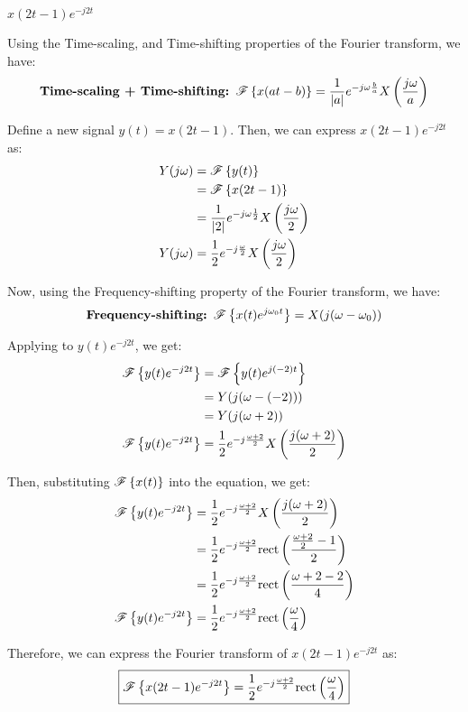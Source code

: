\documentclass[a4paper, 10pt]{article}
\begin{document}
\begin{tosubmit}
\begin{subproblems}[start=4]
    \item \( x(2t-1) e^{-j2t} \)
\end{subproblems}

\par\noindent\submitsolution
Using the Time-scaling, and Time-shifting properties of the Fourier transform, we have:
\[
    \textbf{Time-scaling + Time-shifting: } \mathscr{F} \left\{ x(at - b) \right\} = \frac{1}{|a|} e^{-j\omega \frac{b}{a}} X\left( \frac{j\omega}{a} \right)
\]

Define a new signal \( y(t) = x(2t - 1) \). Then, we can express \( x(2t - 1) e^{-j2t} \) as:
\begin{align*}
    Y(j\omega) &= \mathscr{F} \left\{ y(t) \right\} \\
    &= \mathscr{F} \left\{ x(2t - 1) \right\} \\
    &= \frac{1}{|2|} e^{-j\omega \frac{1}{2}} X\left( \frac{j\omega}{2} \right) \\
    Y(j\omega) &= \frac{1}{2} e^{-j\frac{\omega}{2}} X\left( \frac{j\omega}{2} \right)
\end{align*}

Now, using the Frequency-shifting property of the Fourier transform, we have:
\[
    \textbf{Frequency-shifting: } \mathscr{F} \left\{ x(t) e^{j\omega_0 t} \right\} = X(j(\omega - \omega_0))
\]

Applying to \( y(t) e^{-j2t} \), we get:
\begin{align*}  
    \mathscr{F} \left\{ y(t) e^{-j2t} \right\} &= \mathscr{F} \left\{ y(t) e^{j(-2)t} \right\} \\
    &= Y(j(\omega - (-2))) \\
    &= Y(j(\omega + 2)) \\
    \mathscr{F} \left\{ y(t) e^{-j2t} \right\} &= \frac{1}{2} e^{-j\frac{\omega + 2}{2}} X\left( \frac{j(\omega + 2)}{2} \right)
\end{align*}

Then, substituting \( \mathscr{F} \left\{ x(t) \right\} \) into the equation, we get:
\begin{align*}  
    \mathscr{F} \left\{ y(t) e^{-j2t} \right\} &= \frac{1}{2} e^{-j\frac{\omega + 2}{2}} X\left( \frac{j(\omega + 2)}{2} \right) \\
    &= \frac{1}{2} e^{-j\frac{\omega + 2}{2}} \textrm{rect} \left( \frac{\frac{\omega + 2}{2} - 1}{2} \right) \\
    &= \frac{1}{2} e^{-j\frac{\omega + 2}{2}} \textrm{rect} \left( \frac{\omega + 2 - 2}{4} \right) \\
    \mathscr{F} \left\{ y(t) e^{-j2t} \right\} &= \frac{1}{2} e^{-j\frac{\omega + 2}{2}} \textrm{rect} \left( \frac{\omega}{4} \right)
\end{align*}

Therefore, we can express the Fourier transform of \( x(2t - 1) e^{-j2t} \) as:
\[ \boxed{
    \mathscr{F} \left\{ x(2t - 1) e^{-j2t} \right\} = \frac{1}{2} e^{-j\frac{\omega + 2}{2}} \textrm{rect} \left( \frac{\omega}{4} \right)
} \]
\end{tosubmit}
\end{document}
